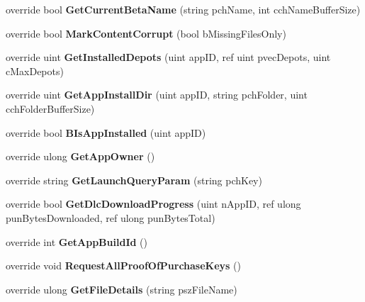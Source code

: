 \begin{DoxyCompactItemize}
override bool {\bfseries Get\+Current\+Beta\+Name} (string pch\+Name, int cch\+Name\+Buffer\+Size)
\item 
\mbox{\label{class_valve_1_1_steamworks_1_1_c_steam_apps_a7f977ce4ed3a668fda076c048c813652}} 
override bool {\bfseries Mark\+Content\+Corrupt} (bool b\+Missing\+Files\+Only)
\item 
\mbox{\label{class_valve_1_1_steamworks_1_1_c_steam_apps_ae286bbc6240dc02ea8e536a45ebff8bf}} 
override uint {\bfseries Get\+Installed\+Depots} (uint app\+ID, ref uint pvec\+Depots, uint c\+Max\+Depots)
\item 
\mbox{\label{class_valve_1_1_steamworks_1_1_c_steam_apps_ac84007dbbde7e0821b2f65ea3f7de784}} 
override uint {\bfseries Get\+App\+Install\+Dir} (uint app\+ID, string pch\+Folder, uint cch\+Folder\+Buffer\+Size)
\item 
\mbox{\label{class_valve_1_1_steamworks_1_1_c_steam_apps_a4238803bc3b9ada9c0a0ca0b2898135e}} 
override bool {\bfseries B\+Is\+App\+Installed} (uint app\+ID)
\item 
\mbox{\label{class_valve_1_1_steamworks_1_1_c_steam_apps_abc5a1926698fb6b7fa8cc3eee8e5fc81}} 
override ulong {\bfseries Get\+App\+Owner} ()
\item 
\mbox{\label{class_valve_1_1_steamworks_1_1_c_steam_apps_a2bb865b7e0c439bffee3dd89302c8bbb}} 
override string {\bfseries Get\+Launch\+Query\+Param} (string pch\+Key)
\item 
\mbox{\label{class_valve_1_1_steamworks_1_1_c_steam_apps_a2c20d6e99aabd2befa93b969c7d3860b}} 
override bool {\bfseries Get\+Dlc\+Download\+Progress} (uint n\+App\+ID, ref ulong pun\+Bytes\+Downloaded, ref ulong pun\+Bytes\+Total)
\item 
\mbox{\label{class_valve_1_1_steamworks_1_1_c_steam_apps_a43b99891c6190cb89d820957e300ccb5}} 
override int {\bfseries Get\+App\+Build\+Id} ()
\item 
\mbox{\label{class_valve_1_1_steamworks_1_1_c_steam_apps_a864ce4f9d48c355b6bccb2e87f05b060}} 
override void {\bfseries Request\+All\+Proof\+Of\+Purchase\+Keys} ()
\item 
\mbox{\label{class_valve_1_1_steamworks_1_1_c_steam_apps_aecf0381bcfd2d3d40d48370f7d5731df}} 
override ulong {\bfseries Get\+File\+Details} (string psz\+File\+Name)
\end{DoxyCompactItemize}


